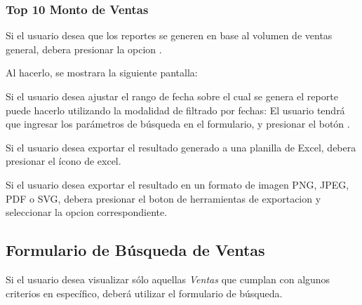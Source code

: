 \documentclass[a4paper,10pt,spanish]{sphinxmanual}
\begin{document}
\subsubsection{Top 10 Monto de Ventas}
\label{ventas:top-10-monto-de-ventas}\label{ventas:top10-mont-vtas-pf}
Si el usuario desea que los reportes se generen en base al volumen de ventas general, debera presionar la opcion .


Al hacerlo, se mostrara la siguiente pantalla:



Si el usuario desea ajustar el rango de fecha sobre el cual se genera el reporte puede hacerlo utilizando la modalidad de filtrado por fechas:
El usuario tendrá que ingresar los parámetros de búsqueda en el formulario, y presionar el botón .


Si el usuario desea exportar el resultado generado a una planilla de Excel, debera presionar el ícono de excel.


Si el usuario desea exportar el resultado en un formato de imagen PNG, JPEG, PDF o SVG, debera presionar el boton de herramientas de exportacion y seleccionar la opcion correspondiente.



\subsection{Formulario de Búsqueda de Ventas}
\label{ventas:formulario-busqueda-ventas}\label{ventas:formulario-de-busqueda-de-ventas}
Si el usuario desea visualizar sólo aquellas \emph{Ventas} que cumplan con algunos criterios en específico, deberá utilizar el formulario de búsqueda.
\end{document}
